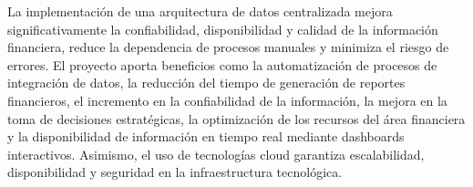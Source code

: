 La implementación de una arquitectura de datos centralizada mejora significativamente la confiabilidad, disponibilidad y calidad de la información financiera, reduce la dependencia de procesos manuales y minimiza el riesgo de errores. El proyecto aporta beneficios como la automatización de procesos de integración de datos, la reducción del tiempo de generación de reportes financieros, el incremento en la confiabilidad de la información, la mejora en la toma de decisiones estratégicas, la optimización de los recursos del área financiera y la disponibilidad de información en tiempo real mediante dashboards interactivos. Asimismo, el uso de tecnologías cloud garantiza escalabilidad, disponibilidad y seguridad en la infraestructura tecnológica.
